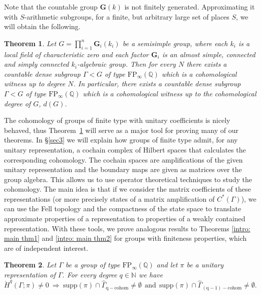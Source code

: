 \documentclass[12pt,reqno]{amsart}
\newcommand{\N}{\mathbb{N}}
\newcommand{\Q}{\mathbb{Q}}
\newtheorem{mainthm}{Theorem}
\theoremstyle{definition}
\newcommand{\torH}{\mathring{H}}
\begin{document}
Note that the countable group $\mathbf{G}(k)$ is not finitely generated.
Approximating it with $S$-arithmetic subgroups, for a finite, but arbitrary large set of places $S$, we will obtain the following.

\begin{mainthm}\label{intro:finite witness}
Let $G=\prod_{i=1}^n \mathbf{G}_i(k_i)$ be a semisimple group, where each $k_i$ is a local field of characteristic zero and each factor $\mathbf{G}_i$ is an almost simple, connected and simply connected $k_i$-algebraic group. Then for every $N$ there exists a countable dense subgroup $\Gamma<G$ of type $\mathrm{FP}_\infty(\Q)$ which is a cohomological witness up to degree $N$. In particular, there exists a countable dense subgroup $\Gamma<G$ of type $\mathrm{FP}_\infty(\Q)$
which is a cohomological witness up to the cohomological degree of $G$, $d(G)$.
\end{mainthm}

The cohomology of groups of finite type with unitary coefficients is nicely behaved,
thus Theorem~\ref{intro:finite witness} will serve as a major tool for proving many of our theorems.
In \S\ref{sec3} we will explain how groups of finite type admit, for any unitary representation, a cochain complex of Hilbert spaces that calculates the corresponding cohomology.
The cochain spaces are amplifications of the given unitary representation and the boundary maps are given as matrices over the group algebra. This allows us to use operator theoretical techniques to study the cohomology. The main idea is that if we consider the matrix coefficients of these representations (or more precisely states of a matrix amplification of $C^*(\Gamma)$), we can use the Fell topology and the compactness of the state space to translate approximate properties of a representation to properties of a weakly contained representation.
With these tools, we prove analogous results to Theorems \ref{intro: main thm1} and \ref{intro: main thm2} for groups with finiteness properties, which are of independent interest.

\begin{mainthm}\label{thm:main_1_finiteness_intro}
    Let $\Gamma$ be a group of type $\mathrm{FP}_\infty(\Q)$ and let $\pi$ be a unitary representation of $\Gamma$. For every degree $q\in\N$ we have
    \[ \torH^q(\Gamma;\pi)\neq 0 ~\Longrightarrow ~ \mathrm{supp}(\pi) \cap \widehat{\Gamma}_{\mathrm{q-cohom}} \neq \emptyset ~~\text{and}~~ \mathrm{supp}(\pi) \cap \widehat{\Gamma}_{\mathrm{(q-1)-cohom}} \neq \emptyset.\]
\end{mainthm}
\end{document}
